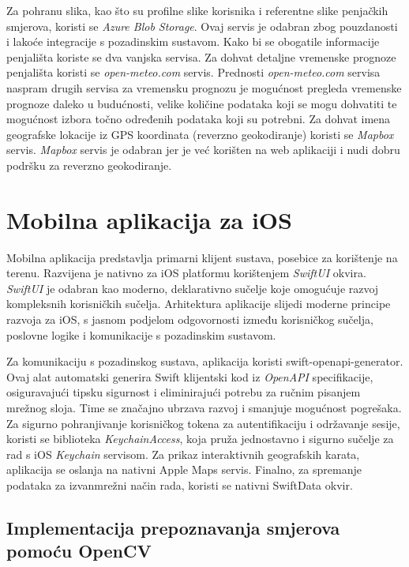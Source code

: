 Za pohranu slika, kao što su profilne slike korisnika i referentne slike penjačkih smjerova, koristi se \textit{Azure Blob Storage}. Ovaj servis je odabran zbog pouzdanosti i lakoće integracije s pozadinskim sustavom. Kako bi se obogatile informacije penjališta koriste se dva vanjska servisa. Za dohvat detaljne vremenske prognoze penjališta koristi se \textit{open-meteo.com} servis. Prednosti \textit{open-meteo.com} servisa naspram drugih servisa za vremensku prognozu je mogućnost pregleda vremenske prognoze daleko u budućnosti, velike količine podataka koji se mogu dohvatiti te mogućnost izbora točno određenih podataka koji su potrebni. Za dohvat imena geografske lokacije iz GPS koordinata (reverzno geokodiranje) koristi se \textit{Mapbox} servis. \textit{Mapbox} servis je odabran jer je već korišten na web aplikaciji i nudi dobru podršku za reverzno geokodiranje.

\section{Mobilna aplikacija za iOS}

Mobilna aplikacija predstavlja primarni klijent sustava, posebice za korištenje na terenu. Razvijena je nativno za iOS platformu korištenjem \textit{SwiftUI} okvira. \textit{SwiftUI} je odabran kao moderno, deklarativno sučelje koje omogućuje razvoj kompleksnih korisničkih sučelja. Arhitektura aplikacije slijedi moderne principe razvoja za iOS, s jasnom podjelom odgovornosti između korisničkog sučelja, poslovne logike i komunikacije s pozadinskim sustavom. 

Za komunikaciju s pozadinskog sustava, aplikacija koristi swift-openapi-generator. Ovaj alat automatski generira Swift klijentski kod iz \textit{OpenAPI} specifikacije, osiguravajući tipsku sigurnost i eliminirajući potrebu za ručnim pisanjem mrežnog sloja. Time se značajno ubrzava razvoj i smanjuje mogućnost pogrešaka. Za sigurno pohranjivanje korisničkog tokena za autentifikaciju i održavanje sesije, koristi se biblioteka \textit{KeychainAccess}, koja pruža jednostavno i sigurno sučelje za rad s iOS \textit{Keychain} servisom. Za prikaz interaktivnih geografskih karata, aplikacija se oslanja na nativni Apple Maps servis. Finalno, za spremanje podataka za izvanmrežni način rada, koristi se nativni SwiftData okvir.

\subsection{Implementacija prepoznavanja smjerova pomoću OpenCV}

